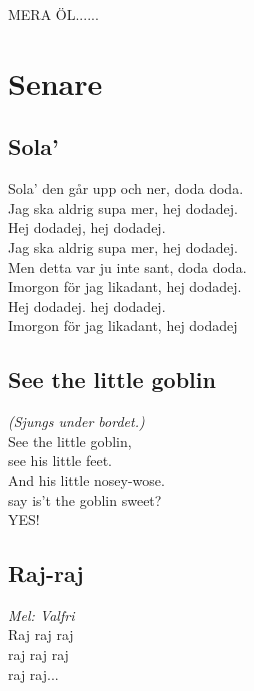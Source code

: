 \documentclass[twoside, openright]{report}
\begin{document}
MERA ÖL......

\chapter{Senare}

\section{Sola'}

Sola' den går upp och ner, doda doda.\\
Jag ska aldrig supa mer, hej dodadej.\\
Hej dodadej, hej dodadej.\\
Jag ska aldrig supa mer, hej dodadej.\\

Men detta var ju inte sant, doda doda.\\
Imorgon för jag likadant, hej dodadej.\\
Hej dodadej. hej dodadej.\\
Imorgon för jag likadant, hej dodadej

\section{See the little goblin}
\textit{(Sjungs under bordet.)}\\

See the little goblin,\\
see his little feet.\\
And his little nosey-wose.\\
say is't the goblin sweet?\\
YES!

\section{Raj-raj}
\textit{Mel: Valfri}\\

Raj raj raj\\
raj raj raj\\
raj raj... 

\end{document}
